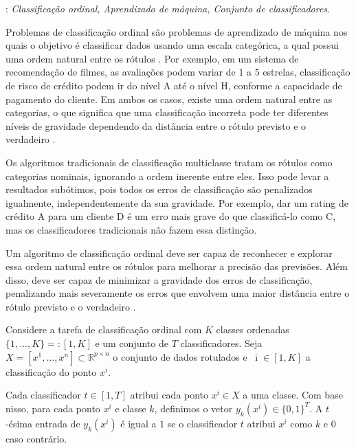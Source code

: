 \documentclass[a4,11pt]{article}
\newcommand{\classi}{\:\!\bar{\imath}}
\begin{document}
: {\it Classificação ordinal, Aprendizado de máquina, Conjunto de classificadores.}

\vspace{0.1cm}

Problemas de classificação ordinal são problemas de aprendizado de máquina nos quais o objetivo é classificar dados usando uma escala categórica, a qual possui uma ordem natural entre os rótulos \cite{gutierrez_etal_survey_2016}. Por exemplo, em um sistema de recomendação de filmes, as avaliações podem variar de 1 a 5 estrelas, classificação de risco de crédito podem ir do nível A até o nível H, conforme a capacidade de pagamento do cliente. Em ambos os casos, existe uma ordem natural entre as categorias, o que significa que uma classificação incorreta pode ter diferentes níveis de gravidade dependendo da distância entre o rótulo previsto e o verdadeiro \cite{frank_hall_simple_2001}.

Os algoritmos tradicionais de classificação multiclasse tratam os rótulos como categorias nominais, ignorando a ordem inerente entre eles. Isso pode levar a resultados subótimos, pois todos os erros de classificação são penalizados igualmente, independentemente da sua gravidade. Por exemplo, dar um rating de crédito A para um cliente D é um erro mais grave do que classificá-lo como C, mas os classificadores tradicionais não fazem essa distinção.

Um algoritmo de classificação ordinal deve ser capaz de reconhecer e explorar essa ordem natural entre os rótulos para melhorar a precisão das previsões. Além disso, deve ser capaz de minimizar a gravidade dos erros de classificação, penalizando mais severamente os erros que envolvem uma maior distância entre o rótulo previsto e o verdadeiro \cite{herbrich_etal_sv_1999}.

Considere a tarefa de classificação ordinal com $K$ classes ordenadas $\{1,\ldots, K\} =: [1,K]$ e um conjunto de $T$ classificadores. Seja $X = [x^1, \dotsc, x^n] \subset \mathbb{R}^{p\times n}$ o conjunto de dados rotulados e $\classi \in [1,K]$ a classificação do ponto $x^i$.

Cada classificador $t \in [1,T]$ atribui cada ponto $x^i \in X$ a uma classe. Com base nisso, para cada ponto $x^i$ e classe $k$, definimos o vetor $y_k (x^i) \in \{0,1\}^T$. A $t$-ésima entrada de $y_k (x^i)$ é igual a \(1\) se o classificador $t$ atribui \(x^i \) como \(k\) e \(0\) caso contrário.
\end{document}
